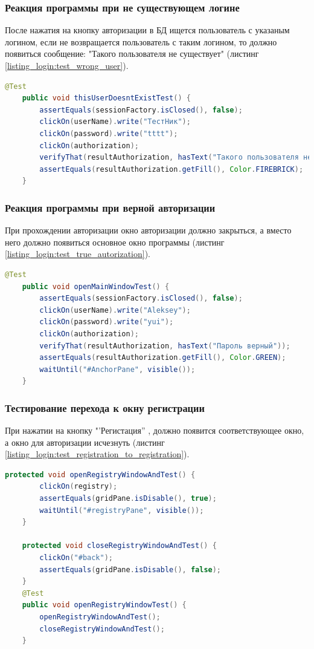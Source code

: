\documentclass[a4paper,12pt]{article}
\begin{document}
\subsubsection{Реакция программы при не существующем логине}
После нажатия на кнопку авторизации в БД ищется пользователь с указаным логином, если не возвращается пользователь с таким логином, то должно появиться сообщение: "Такого пользователя не существует" (листинг \ref{listing_login:test_wrong_user}).
\begin{lstlisting}[language=java, caption=Тестирование при несуществующем логине, label=listing_login:test_wrong_user]
    @Test
    public void thisUserDoesntExistTest() {
        assertEquals(sessionFactory.isClosed(), false);
        clickOn(userName).write("ТестНик");
        clickOn(password).write("tttt");
        clickOn(authorization);
        verifyThat(resultAuthorization, hasText("Такого пользователя не существует"));
        assertEquals(resultAuthorization.getFill(), Color.FIREBRICK);
    }
\end{lstlisting}


\subsubsection{Реакция программы при верной авторизации}
При прохождении авторизации окно авторизации должно закрыться, а вместо него должно появиться основное окно программы (листинг \ref{listing_login:test_true_autorization}). 

\begin{lstlisting}[language=java, caption=Тестирование прохождения авторизации, label=listing_login:test_true_autorization]
    @Test
    public void openMainWindowTest() {
        assertEquals(sessionFactory.isClosed(), false);
        clickOn(userName).write("Aleksey");
        clickOn(password).write("yui");
        clickOn(authorization);
        verifyThat(resultAuthorization, hasText("Пароль верный"));
        assertEquals(resultAuthorization.getFill(), Color.GREEN);
        waitUntil("#AnchorPane", visible());
    }
\end{lstlisting}

\subsubsection{Тестирование перехода к окну регистрации}
При нажатии на кнопку "'Регистация'' , должно появится соответствующее окно, а окно для авторизации исчезнуть (листинг \ref{listing_login:test_registration_to_registration}). 
\begin{lstlisting}[language=java, caption=Тестирование перехода к окну регистрации, label=listing_login:test_registration_to_registration]
	protected void openRegistryWindowAndTest() {
        clickOn(registry);
        assertEquals(gridPane.isDisable(), true);
        waitUntil("#registryPane", visible());
    }

    protected void closeRegistryWindowAndTest() {
        clickOn("#back");
        assertEquals(gridPane.isDisable(), false);
    }     
    @Test
    public void openRegistryWindowTest() {
        openRegistryWindowAndTest();
        closeRegistryWindowAndTest();
    }
\end{lstlisting}
\end{document}
